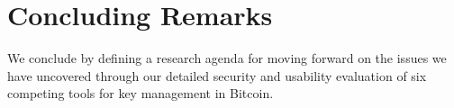 
\section{Concluding Remarks}

We conclude by defining a research agenda for moving forward on the issues we have uncovered through our detailed security and usability evaluation of six competing tools for key management in Bitcoin. 



